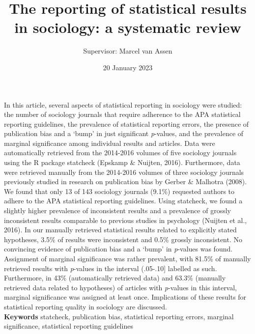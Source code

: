 \documentclass[
  12pt,
]{article}
\title{The reporting of statistical results in sociology: a systematic review}
\author{Supervisor: Marcel van Assen}
\date{20 January 2023}
\begin{document}
\maketitle

\pagebreak

In this article, several aspects of statistical reporting in sociology
were studied: the number of sociology journals that require adherence to
the APA statistical reporting guidelines, the prevalence of statistical
reporting errors, the presence of publication bias and a `bump' in just
significant \emph{p}-values, and the prevalence of marginal significance
among individual results and articles. Data were automatically retrieved
from the 2014-2016 volumes of five sociology journals using the R
package statcheck (Epskamp \& Nuijten, 2016). Furthermore, data were
retrieved manually from the 2014-2016 volumes of three sociology
journals previously studied in research on publication bias by Gerber \&
Malhotra (2008). We found that only 13 of 143 sociology journals (9.1\%)
requested authors to adhere to the APA statistical reporting guidelines.
Using statcheck, we found a slightly higher prevalence of inconsistent
results and a prevalence of grossly inconsistent results comparable to
previous studies in psychology (Nuijten et al., 2016). In our manually
retrieved statistical results related to explicitly stated hypotheses,
3.5\% of results were inconsistent and 0.5\% grossly inconsistent. No
convincing evidence of publication bias and a `bump' in \emph{p}-values
was found. Assignment of marginal significance was rather prevalent,
with 81.5\% of manually retrieved results with \emph{p}-values in the
interval (.05-.10{]} labelled as such. Furthermore, in 43\%
(automatically retrieved data) and 63.3\% (manually retrieved data
related to hypotheses) of articles with \emph{p}-values in this
interval, marginal significance was assigned at least once. Implications
of these results for statistical reporting quality in sociology are
discussed. \\

\textbf{Keywords} statcheck, publication bias, statistical reporting
errors, marginal significance, statistical reporting guidelines
\pagebreak
\end{document}
